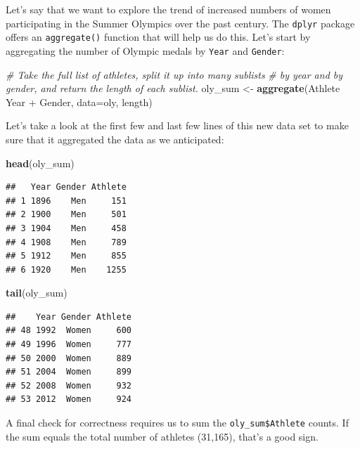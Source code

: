 \documentclass[]{book}
\newenvironment{Shaded}{\begin{snugshade}}{\end{snugshade}}
\newcommand{\KeywordTok}[1]{\textcolor[rgb]{0.13,0.29,0.53}{\textbf{{#1}}}}
\newcommand{\DataTypeTok}[1]{\textcolor[rgb]{0.13,0.29,0.53}{{#1}}}
\newcommand{\StringTok}[1]{\textcolor[rgb]{0.31,0.60,0.02}{{#1}}}
\newcommand{\CommentTok}[1]{\textcolor[rgb]{0.56,0.35,0.01}{\textit{{#1}}}}
\newcommand{\NormalTok}[1]{{#1}}
\begin{document}
Let's say that we want to explore the trend of increased numbers of
women participating in the Summer Olympics over the past century. The
\texttt{dplyr} package offers an \texttt{aggregate()} function that will
help us do this. Let's start by aggregating the number of Olympic medals
by \texttt{Year} and \texttt{Gender}:

\begin{Shaded}
\begin{Highlighting}[]
\CommentTok{# Take the full list of athletes, split it up into many sublists }
\CommentTok{# by year and by gender, and return the length of each sublist.}
\NormalTok{oly_sum <-}\StringTok{ }\KeywordTok{aggregate}\NormalTok{(Athlete ~}\StringTok{ }\NormalTok{Year +}\StringTok{ }\NormalTok{Gender, }\DataTypeTok{data=}\NormalTok{oly, length)}
\end{Highlighting}
\end{Shaded}

Let's take a look at the first few and last few lines of this new data
set to make sure that it aggregated the data as we anticipated:

\begin{Shaded}
\begin{Highlighting}[]
\KeywordTok{head}\NormalTok{(oly_sum)}
\end{Highlighting}
\end{Shaded}

\begin{verbatim}
##   Year Gender Athlete
## 1 1896    Men     151
## 2 1900    Men     501
## 3 1904    Men     458
## 4 1908    Men     789
## 5 1912    Men     855
## 6 1920    Men    1255
\end{verbatim}

\begin{Shaded}
\begin{Highlighting}[]
\KeywordTok{tail}\NormalTok{(oly_sum)}
\end{Highlighting}
\end{Shaded}

\begin{verbatim}
##    Year Gender Athlete
## 48 1992  Women     600
## 49 1996  Women     777
## 50 2000  Women     889
## 51 2004  Women     899
## 52 2008  Women     932
## 53 2012  Women     924
\end{verbatim}

A final check for correctness requires us to sum the
\texttt{oly\_sum\$Athlete} counts. If the sum equals the total number of
athletes (31,165), that's a good sign.
\end{document}
